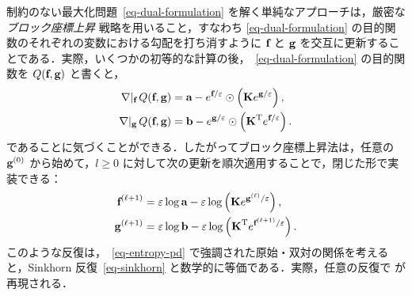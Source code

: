 \begin{rem}\label{rem-sinkh-block}
制約のない最大化問題~\eqref{eq-dual-formulation} を解く単純なアプローチは，厳密な \emph{ブロック座標上昇} 戦略を用いること，すなわち \eqref{eq-dual-formulation} の目的関数のそれぞれの変数における勾配を打ち消すように $\mathrm{\textbf{f}}$ と $\mathrm{\textbf{g}}$ を交互に更新することである．実際，いくつかの初等的な計算の後，~\eqref{eq-dual-formulation} の目的関数を $Q(\mathrm{\textbf{f}},\mathrm{\textbf{g}})$ と書くと，
\begin{align}
	\label{eq-dualupadate-sinkh-1}\nabla|_{\mathrm{\textbf{f}}}\, Q(\mathrm{\textbf{f}},\mathrm{\textbf{g}}) &=  \mathrm{\textbf{a}} - e^{\mathrm{\textbf{f}}/\varepsilon}\odot \left(\mathrm{\textbf{K}} e^{\mathrm{\textbf{g}}/\varepsilon}\right),\\
	\label{eq-dualupadate-sinkh-2}\nabla|_{\mathrm{\textbf{g}}}\, Q(\mathrm{\textbf{f}},\mathrm{\textbf{g}}) &=  \mathrm{\textbf{b}} - e^{\mathrm{\textbf{g}}/\varepsilon}\odot \left({\mathrm{\textbf{K}}}^{\mathrm{T}} e^{\mathrm{\textbf{f}}/\varepsilon}\right).
\end{align}
であることに気づくことができる．したがってブロック座標上昇法は，任意の $\mathrm{\textbf{g}}^{(0)}$ から始めて，$l\geq 0$ に対して次の更新を順次適用することで，閉じた形で実装できる：
\begin{align}
	\label{eq-slse-sinkh-1}\mathrm{\textbf{f}}^{(\ell+1)} &= \varepsilon \log \mathrm{\textbf{a}} -\varepsilon\log\left(\mathrm{\textbf{K}} e^{\mathrm{\textbf{g}}^{(\ell)}/\varepsilon}\right), \\
	\label{eq-slse-sinkh-2}\mathrm{\textbf{g}}^{(\ell+1)} &= \varepsilon \log \mathrm{\textbf{b}}- \varepsilon\log\left({\mathrm{\textbf{K}}}^{\mathrm{T}} e^{\mathrm{\textbf{f}}^{(\ell+1)}/\varepsilon}\right).
\end{align}
このような反復は，~\eqref{eq-entropy-pd} で強調された原始・双対の関係を考えると，Sinkhorn 反復~\eqref{eq-sinkhorn} と数学的に等価である．実際，任意の反復で
が再現される．
\end{rem}

